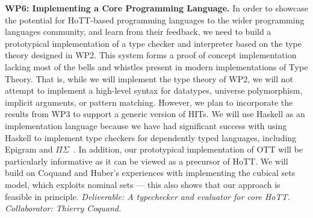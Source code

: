 \documentclass[a4paper,11pt]{article}
\begin{document}
{\bf WP6: Implementing a Core Programming Language.} In order to
showcase the potential for HoTT-based programming languages to the
wider programming languages community, and learn from their feedback,
we need to build a prototypical implementation of a type checker and
interpreter based on the type theory designed in WP2.  This system
forms a proof of concept implementation lacking most of the bells and
whistles present in modern implementations of Type Theory. That is,
while we will implement the type theory of WP2, we will not attempt to
implement a high-level syntax for datatypes, universe polymorphism,
implicit arguments, or pattern matching. However, we plan to
incorporate the results from WP3 to support a generic version of
HITs. We will use Haskell as an implementation language because we
have had significant success with using Haskell to implement type
checkers for dependently typed languages, including Epigram and
$\Pi\Sigma$~\cite{alti:checking,easy,alti:pisigma-new}.  In addition,
our prototypical implementation of OTT will be particularly
informative as it can be viewed as a precursor of HoTT.  We will build
on Coquand and Huber's experiences with implementing the cubical sets
model, which exploits nominal sets \cite{nominal}--- this also shows
that our approach is feasible in principle.  {\em Deliverable: A
  typechecker and evaluator for core HoTT.  Collaborator: Thierry
  Coquand.  }


\end{document}
